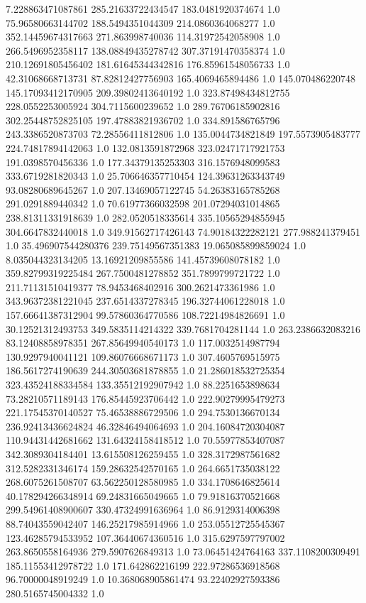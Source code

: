 7.228863471087861	285.21633722434547	183.0481920374674	1.0
75.96580663144702	188.5494351044309	214.0860364068277	1.0
352.14459674317663	271.863998740036	114.31972542058908	1.0
266.5496952358117	138.08849435278742	307.37191470358374	1.0
210.12691805456402	181.61645344342816	176.85961548056733	1.0
42.31068668713731	87.82812427756903	165.4069465894486	1.0
145.070486220748	145.17093412170905	209.39802413640192	1.0
323.87498434812755	228.0552253005924	304.7115600239652	1.0
289.76706185902816	302.25448752825105	197.47883821936702	1.0
334.891586765796	243.3386520873703	72.28556411812806	1.0
135.0044734821849	197.5573905483777	224.74817894142063	1.0
132.0813591872968	323.02471717921753	191.0398570456336	1.0
177.34379135253303	316.1576948099583	333.6719281820343	1.0
25.706646357710454	124.39631263343749	93.08280689645267	1.0
207.13469057122745	54.26383165785268	291.0291889440342	1.0
70.61977366032598	201.07294031014865	238.81311331918639	1.0
282.0520518335614	335.10565294855945	304.6647832440018	1.0
349.91562717426143	74.90184322282121	277.988241379451	1.0
35.496907544280376	239.75149567351383	19.065085899859024	1.0
8.035044323134205	13.16921209855586	141.45739608078182	1.0
359.82799319225484	267.7500481278852	351.7899799721722	1.0
211.71131510419377	78.9453468402916	300.2621473361986	1.0
343.96372381221045	237.6514337278345	196.32744061228018	1.0
157.66641387312904	99.57860364770586	108.72214984826691	1.0
30.12521312493753	349.5835114214322	339.7681704281144	1.0
263.2386632083216	83.12408858978351	267.85649940540173	1.0
117.0032514987794	130.9297940041121	109.86076668671173	1.0
307.4605769515975	186.5617274190639	244.30503681878855	1.0
21.286018532725354	323.43524188334584	133.35512192907942	1.0
88.2251653898634	73.28210571189143	176.85445923706442	1.0
222.90279995479273	221.17545370140527	75.46538886729506	1.0
294.7530136670134	236.92413436624824	46.32846494064693	1.0
204.16084720304087	110.94431442681662	131.64324158418512	1.0
70.55977853407087	342.3089304184401	13.615508126259455	1.0
328.3172987561682	312.5282331346174	159.28632542570165	1.0
264.6651735038122	268.6075261508707	63.562250128580985	1.0
334.1708646825614	40.178294266348914	69.24831665049665	1.0
79.91816370521668	299.54961408900607	330.47324991636964	1.0
86.9129314006398	88.74043559042407	146.25217985914966	1.0
253.05512725545367	123.46285794533952	107.36440674360516	1.0
315.6297597797002	263.8650558164936	279.5907626849313	1.0
73.06451424764163	337.1108200309491	185.11553412978722	1.0
171.642862216199	222.97286536918568	96.70000048919249	1.0
10.368068905861474	93.22402927593386	280.5165745004332	1.0
